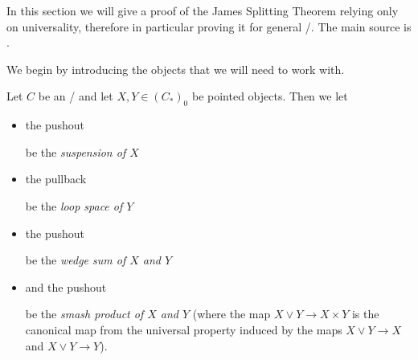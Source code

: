 In this section we will give a proof of the James Splitting Theorem relying only on universality, therefore in particular proving it for general \inftytops/. 
The main source is \cite[\S 2.2 and \S 4]{splittings_21}.

We begin by introducing the objects that we will need to work with.
\begin{definition}
    Let $C$ be an \inftytop/ and let $X,Y\in \left(C_*\right)_0$ be pointed objects. 
    Then we let 
    \begin{itemize}
        \item the pushout
        \begin{center}
        \end{center}
        be the \emph{suspension of $X$}
        \item the pullback
        \begin{center}
        \end{center}
        be the \emph{loop space of $Y$}
        \item the pushout
        \begin{center}
        \end{center}
        be the \emph{wedge sum of $X$ and $Y$} 
        \item and the pushout 
        \begin{center}
        \end{center}
        be the \emph{smash product of $X$ and $Y$} (where the map $X\vee Y\to X\times Y$ is the canonical map from the universal property induced by the maps $X\vee Y\to X$ and $X\vee Y\to Y$).
    \end{itemize}
\end{definition}
